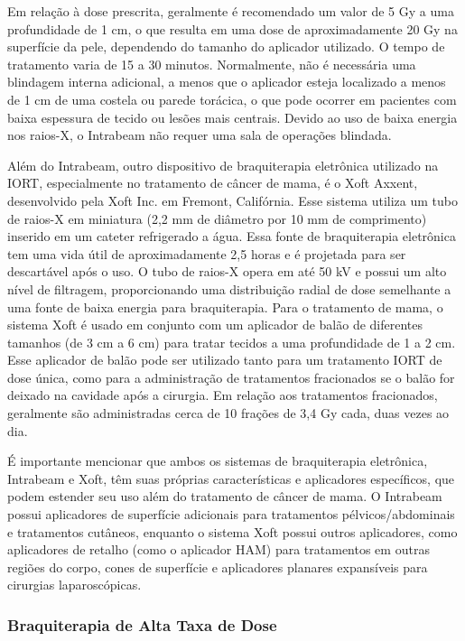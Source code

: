 \documentclass[11pt,a4paper]{article}
\begin{document}
	Em relação à dose prescrita, geralmente é recomendado um valor de 5 Gy a uma profundidade de 1 cm, o que resulta em uma dose de aproximadamente 20 Gy na superfície da pele, dependendo do tamanho do aplicador utilizado. O tempo de tratamento varia de 15 a 30 minutos. Normalmente, não é necessária uma blindagem interna adicional, a menos que o aplicador esteja localizado a menos de 1 cm de uma costela ou parede torácica, o que pode ocorrer em pacientes com baixa espessura de tecido ou lesões mais centrais. Devido ao uso de baixa energia nos raios-X, o Intrabeam não requer uma sala de operações blindada.

	Além do Intrabeam, outro dispositivo de braquiterapia eletrônica utilizado na IORT, especialmente no tratamento de câncer de mama, é o Xoft Axxent, desenvolvido pela Xoft Inc. em Fremont, Califórnia. Esse sistema utiliza um tubo de raios-X em miniatura (2,2 mm de diâmetro por 10 mm de comprimento) inserido em um cateter refrigerado a água. Essa fonte de braquiterapia eletrônica tem uma vida útil de aproximadamente 2,5 horas e é projetada para ser descartável após o uso. O tubo de raios-X opera em até 50 kV e possui um alto nível de filtragem, proporcionando uma distribuição radial de dose semelhante a uma fonte de baixa energia para braquiterapia. Para o tratamento de mama, o sistema Xoft é usado em conjunto com um aplicador de balão de diferentes tamanhos (de 3 cm a 6 cm) para tratar tecidos a uma profundidade de 1 a 2 cm. Esse aplicador de balão pode ser utilizado tanto para um tratamento IORT de dose única, como para a administração de tratamentos fracionados se o balão for deixado na cavidade após a cirurgia. Em relação aos tratamentos fracionados, geralmente são administradas cerca de 10 frações de 3,4 Gy cada, duas vezes ao dia.

	É importante mencionar que ambos os sistemas de braquiterapia eletrônica, Intrabeam e Xoft, têm suas próprias características e aplicadores específicos, que podem estender seu uso além do tratamento de câncer de mama. O Intrabeam possui aplicadores de superfície adicionais para tratamentos pélvicos/abdominais e tratamentos cutâneos, enquanto o sistema Xoft possui outros aplicadores, como aplicadores de retalho (como o aplicador HAM) para tratamentos em outras regiões do corpo, cones de superfície e aplicadores planares expansíveis para cirurgias laparoscópicas.

\subsubsection*{Braquiterapia de Alta Taxa de Dose}
\end{document}
